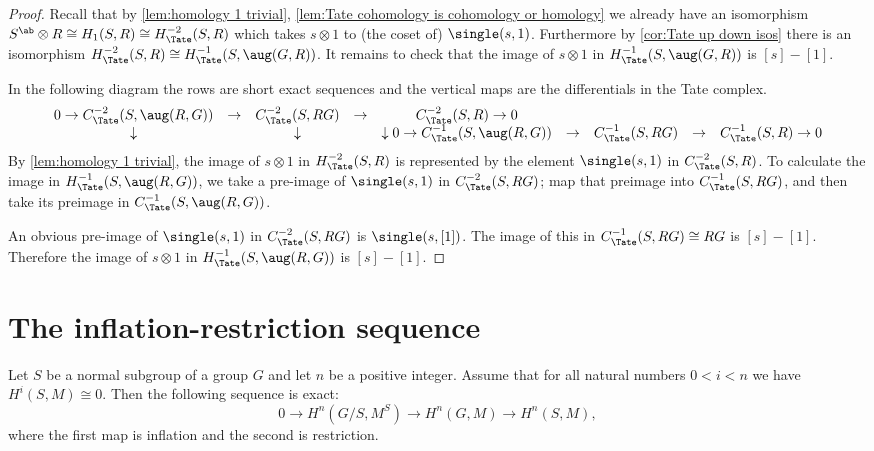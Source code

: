 \begin{proof}
	Recall that by \ref{lem:homology 1 trivial}, \ref{lem:Tate cohomology is cohomology or homology}
	we already have an isomorphism
	$S^\ab \otimes R \cong H_1(S,R) \cong H^{-2}_{\Tate}(S,R)$ which takes $s \otimes 1$ to
	(the coset of) $\single(s,1)$.
	Furthermore by \ref{cor:Tate up down isos} there is an isomorphism
	$H^{-2}_{\Tate}(S,R) \cong H^{-1}_{\Tate}(S,\aug(G,R))$.
	It remains to check that the image of $s \otimes 1$ in $H^{-1}_{\Tate}(S,\aug(G,R))$ is
	$[s]-[1]$.

	In the following diagram the rows are short exact sequences and the vertical maps are
	the differentials in the Tate complex.
	\[
		\begin{matrix}
			0 \to C^{-2}_{\Tate}(S,\aug(R,G)) & \to & C^{-2}_{\Tate}(S,RG) & \to &C^{-2}_{\Tate}(S,R) \to 0\\
			\downarrow & &\downarrow & &\downarrow
			0 \to C^{-1}_{\Tate}(S,\aug(R,G)) & \to & C^{-1}_{\Tate}(S,RG) & \to &C^{-1}_{\Tate}(S,R) \to 0
		\end{matrix}
	\]
	By \ref{lem:homology 1 trivial}, the image of $s \otimes 1$ in $H^{-2}_{\Tate}(S,R)$ is
	represented by the element $\single(s,1)$
	in $C^{-2}_{\Tate}(S,R)$.
	To calculate the image in $H^{-1}_{\Tate}(S,\aug(R,G))$, we take a pre-image of $\single(s,1)$
	in $C^{-2}_{\Tate}(S,RG)$; map that preimage into $C^{-1}_{\Tate}(S,RG)$, and then take its
	preimage in $C^{-1}_{\Tate}(S,\aug(R,G))$.

	An obvious pre-image of $\single(s,1)$ in $C^{-2}_{\Tate}(S,RG)$ is $\single(s,[1])$.
	The image of this in $C^{-1}_{\Tate}(S,RG) \cong RG$ is $[s]-[1]$.
	Therefore the image of $s \otimes 1$ in $H^{-1}_{\Tate}(S,\aug(R,G))$ is $[s]-[1]$.
\end{proof}




\section{The inflation-restriction sequence}

\begin{theorem}
	\label{thm:inflation restriction sequence}
	\leanok
	Let $S$ be a normal subgroup of a group $G$ and let $n$ be a positive integer.
	Assume that for all natural numbers $0 <i < n$ we have $H^{i}(S,M) \cong 0$.
	Then the following sequence is exact:
	\[
		0 \to H^{n}(G/S, M^S) \to H^{n}(G,M) \to H^{n}(S,M),
	\]
	where the first map is inflation and the second is restriction.
\end{theorem}


